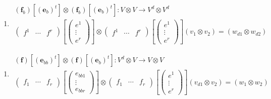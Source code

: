 \documentclass[aps,preprint]{revtex4}
\begin{document}
\begin{enumerate}
\begin{enumerate}
\item 
\begin{gather}
\left( \boldsymbol{f}_{b}\right) \left[ \left( \mathbf{e}_{b}\right) ^{t}%
\right] \otimes \left( \boldsymbol{f}_{b}\right) \left[ \left( \mathbf{e}%
_{b}\right) ^{t}\right] :V\otimes V\rightarrow V^{d}\otimes V^{d} \\
\left( 
\begin{array}{ccc}
f^{1} & \cdots & f^{r}%
\end{array}%
\right) \left[ \left( 
\begin{array}{c}
e^{1} \\ 
\vdots \\ 
e^{r}%
\end{array}%
\right) \right] \otimes \left( 
\begin{array}{ccc}
f^{1} & \cdots & f^{r}%
\end{array}%
\right) \left[ \left( 
\begin{array}{c}
e^{1} \\ 
\vdots \\ 
e^{r}%
\end{array}%
\right) \right] \left( v_{1}\otimes v_{2}\right) =\left( w_{d1}\otimes
w_{d2}\right)
\end{gather}
\end{enumerate}

\begin{enumerate}
\item 
\begin{gather}
\left( \boldsymbol{f}\right) \left[ \left( \mathbf{e}_{bb}\right) ^{t}\right]
\otimes \left( \boldsymbol{f}\right) \left[ \left( \mathbf{e}_{b}\right) ^{t}%
\right] :V^{d}\otimes V\rightarrow V\otimes V \\
\left( 
\begin{array}{ccc}
f_{1} & \cdots & f_{r}%
\end{array}%
\right) \left[ \left( 
\begin{array}{c}
e_{bb1} \\ 
\vdots \\ 
e_{bbr}%
\end{array}%
\right) \right] \otimes \left( 
\begin{array}{ccc}
f_{1} & \cdots & f_{r}%
\end{array}%
\right) \left[ \left( 
\begin{array}{c}
e^{1} \\ 
\vdots \\ 
e^{r}%
\end{array}%
\right) \right] \left( v_{d1}\otimes v_{2}\right) =\left( w_{1}\otimes
w_{2}\right)
\end{gather}


\end{enumerate}
\end{enumerate}
\end{document}
